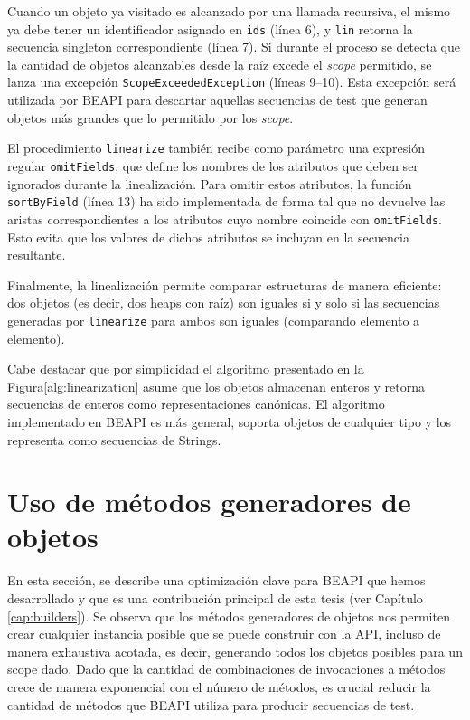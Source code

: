 Cuando un objeto ya visitado es alcanzado por una llamada recursiva, el mismo ya debe tener un identificador asignado en \texttt{ids} 
(línea 6), y \texttt{lin} retorna la secuencia singleton correspondiente (línea 7). Si durante el proceso se detecta que la cantidad de 
objetos alcanzables desde la raíz excede el \emph{scope} permitido, se lanza una excepción \texttt{ScopeExceededException} (líneas 9--10). Esta 
excepción será utilizada por \textsf{BEAPI} para descartar aquellas secuencias
de test que generan objetos más grandes que lo permitido por los \emph{scope}.

El procedimiento \texttt{linearize} también recibe como parámetro una expresión regular \texttt{omitFields}, que define los nombres 
de los atributos que deben ser ignorados durante la linealización. Para omitir estos 
atributos, la función \texttt{sortByField} (línea 13) ha sido implementada de forma tal que no devuelve las aristas correspondientes a 
los atributos cuyo nombre coincide con \texttt{omitFields}. Esto evita que los
valores de dichos atributos se incluyan en la secuencia resultante.

Finalmente, la linealización permite comparar estructuras de manera eficiente:
dos objetos (es decir, dos heaps con raíz) son iguales 
si y solo si las secuencias generadas por \texttt{linearize} para ambos son
iguales (comparando elemento a elemento).

Cabe destacar que por simplicidad el algoritmo presentado en la Figura\ref{alg:linearization} 
asume que los objetos almacenan enteros y retorna secuencias de enteros como representaciones
canónicas. El algoritmo implementado en BEAPI es más general, soporta objetos de
cualquier tipo y los representa como secuencias de Strings.

\section{Uso de m\'etodos generadores de objetos}
\label{sec:buildersOptimization}
En esta sección, se describe una optimización clave para BEAPI que hemos desarrollado y que es
una contribución principal de esta tesis (ver Capítulo \ref{cap:builders}).
Se observa que los métodos generadores de objetos nos permiten crear cualquier
instancia posible que se puede construir con la API, incluso de manera
exhaustiva acotada, es decir, generando todos los objetos posibles para un scope dado.
Dado que la cantidad de combinaciones de invocaciones a métodos crece de manera
exponencial con el número de métodos, es crucial reducir la cantidad de métodos
que \textsf{BEAPI} utiliza para producir secuencias de test. 

